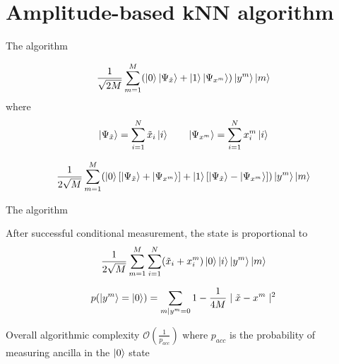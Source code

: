 \documentclass[10pt]{beamer}
\begin{document}
\section{Amplitude-based kNN algorithm}
{
\begin{frame}{The algorithm}

\begin{equation}
\frac{1}{\sqrt{2M}}\sum_{m=1}^{M} (\ket{0}\ket{\Psi_{\tilde{x}}}+\ket{1}\ket{\Psi_{x^{m}}})\ket{y^{m}}\ket{m}
\end{equation}
where
\begin{equation}
\ket{\Psi_{\tilde{x}}} = \sum_{i=1}^{N} \tilde{x}_i\ket{i} \quad \quad
\ket{\Psi_{x^{m}}} = \sum_{i=1}^{N} x_i^m \ket{i}
\end{equation}

\begin{equation}
\frac{1}{2\sqrt{M}}\sum_{m=1}^{M} (\ket{0}[\ket{\Psi_{\tilde{x}}}+\ket{\Psi_{x^{m}}}]+\ket{1}[\ket{\Psi_{\tilde{x}}}-\ket{\Psi_{x^{m}}}])\ket{y^{m}}\ket{m}
\end{equation}
\end{frame}
}

{
\begin{frame}{The algorithm}

After successful conditional measurement, the state is proportional to
\begin{equation}
\frac{1}{2\sqrt{M}}\sum_{m=1}^{M} \sum_{i=1}^{N} (\tilde{x}_i+x_i^m)\ket{0}\ket{i}\ket{y^{m}}\ket{m}
\end{equation}

\begin{equation}
p(\ket{y^m} = \ket{0})= \sum_{m \mid y^m=0} 1 - \frac{1}{4M} \mid \tilde{x} - x^m \mid ^2
\end{equation}
	\begin{alertblock}{Overall algorithmic complexity}
	\centering
	$\mathcal{O}(\frac{1}{p_{acc}})$ where $p_{acc}$ is the probability of measuring ancilla in the $\ket{0}$ state
	\end{alertblock}
\end{frame}
}
\end{document}
